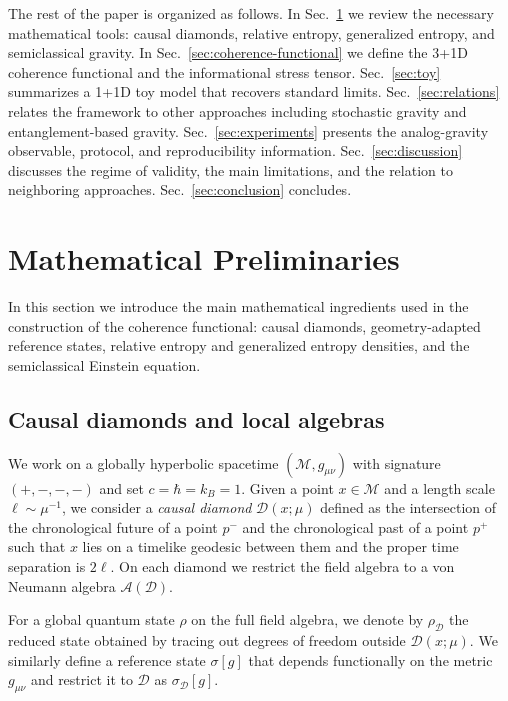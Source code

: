 \documentclass[aps,prd,twocolumn,superscriptaddress,nofootinbib,floatfix]{revtex4-2}
\newcommand{\Ddom}{\mathcal{D}}
\newcommand{\sg}{\sigma[g]}
\begin{document}
The rest of the paper is organized as follows.
In Sec.~\ref{sec:preliminaries} we review the necessary mathematical tools: causal diamonds, relative entropy, generalized entropy, and semiclassical gravity.
In Sec.~\ref{sec:coherence-functional} we define the 3+1D coherence functional and the informational stress tensor.
Sec.~\ref{sec:toy} summarizes a 1+1D toy model that recovers standard limits.
Sec.~\ref{sec:relations} relates the framework to other approaches including stochastic gravity and entanglement-based gravity.
Sec.~\ref{sec:experiments} presents the analog-gravity observable, protocol, and reproducibility information.
Sec.~\ref{sec:discussion} discusses the regime of validity, the main limitations, and the relation to neighboring approaches.
Sec.~\ref{sec:conclusion} concludes.


\section{Mathematical Preliminaries}
\label{sec:preliminaries}

In this section we introduce the main mathematical ingredients used in the construction of the coherence functional: causal diamonds, geometry-adapted reference states, relative entropy and generalized entropy densities, and the semiclassical Einstein equation.

\subsection{Causal diamonds and local algebras}

We work on a globally hyperbolic spacetime $(\mathcal{M},g_{\mu\nu})$ with signature $(+,-,-,-)$ and set $c = \hbar = k_B = 1$.
Given a point $x \in \mathcal{M}$ and a length scale $\ell \sim \mu^{-1}$, we consider a \emph{causal diamond} $\Ddom(x;\mu)$ defined as the intersection of the chronological future of a point $p^-$ and the chronological past of a point $p^+$ such that $x$ lies on a timelike geodesic between them and the proper time separation is $2\ell$.
On each diamond we restrict the field algebra to a von Neumann algebra $\mathcal{A}(\Ddom)$.

For a global quantum state $\rho$ on the full field algebra, we denote by $\rho_{\Ddom}$ the reduced state obtained by tracing out degrees of freedom outside $\Ddom(x;\mu)$.
We similarly define a reference state $\sg$ that depends functionally on the metric $g_{\mu\nu}$ and restrict it to $\Ddom$ as $\sigma_{\Ddom}[g]$.
\end{document}
